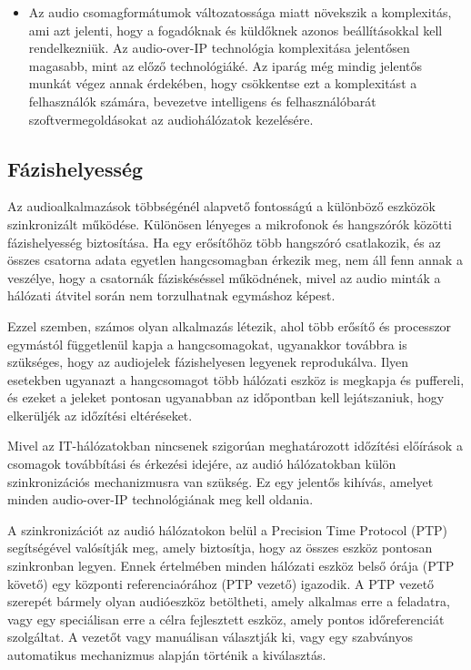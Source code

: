\begin{itemize}
	\item Az audio csomagformátumok változatossága miatt növekszik a komplexitás,
	      ami azt jelenti, hogy a fogadóknak és küldőknek azonos beállításokkal kell
	      rendelkezniük. Az audio-over-IP technológia komplexitása jelentősen magasabb,
	      mint az előző technológiáké. Az iparág még mindig jelentős munkát végez annak
	      érdekében, hogy csökkentse ezt a komplexitást a felhasználók számára, bevezetve
	      intelligens és felhasználóbarát szoftvermegoldásokat az audiohálózatok
	      kezelésére.
\end{itemize}
\subsection{Fázishelyesség}
Az audioalkalmazások többségénél alapvető fontosságú a különböző eszközök szinkronizált működése. 
Különösen lényeges a mikrofonok és hangszórók közötti fázishelyesség biztosítása. 
Ha egy erősítőhöz több hangszóró csatlakozik, és az összes csatorna adata egyetlen hangcsomagban érkezik meg, 
nem áll fenn annak a veszélye, hogy a csatornák fáziskéséssel működnének, mivel az audio minták a 
hálózati átvitel során nem torzulhatnak egymáshoz képest.

Ezzel szemben, számos olyan alkalmazás létezik, ahol több erősítő és processzor egymástól függetlenül 
kapja a hangcsomagokat, ugyanakkor továbbra is szükséges, hogy az audiojelek fázishelyesen legyenek reprodukálva. 
Ilyen esetekben ugyanazt a hangcsomagot több hálózati eszköz is megkapja és puffereli, és ezeket a jeleket 
pontosan ugyanabban az időpontban kell lejátszaniuk, hogy elkerüljék az időzítési eltéréseket.

Mivel az IT-hálózatokban nincsenek szigorúan meghatározott időzítési előírások a csomagok továbbítási és 
érkezési idejére, az audió hálózatokban külön szinkronizációs mechanizmusra van szükség. 
Ez egy jelentős kihívás, amelyet minden audio-over-IP technológiának meg kell oldania.

A szinkronizációt az audió hálózatokon belül a Precision Time Protocol (PTP) segítségével valósítják meg, 
amely biztosítja, hogy az összes eszköz pontosan szinkronban legyen. 
Ennek értelmében minden hálózati eszköz belső órája (PTP követő) egy központi referenciaórához (PTP vezető) igazodik. 
A PTP vezető szerepét bármely olyan audióeszköz betöltheti, amely alkalmas erre a feladatra, vagy egy 
speciálisan erre a célra fejlesztett eszköz, amely pontos időreferenciát szolgáltat. 
A vezetőt vagy manuálisan választják ki, vagy egy szabványos automatikus mechanizmus alapján történik a kiválasztás.

